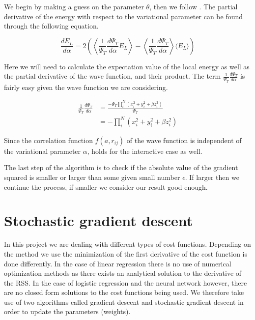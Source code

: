 We begin by making a guess on the parameter $\theta$, then we follow . The partial derivative of the energy with respect to the variational parameter can be found through the following equation.

\begin{equation}
\frac{dE_L}{d\alpha} = 2 \left( \left\langle \frac{1}{\Psi_T}\frac{d \Psi_T}{d \alpha} E_L \right\rangle  - \left\langle  \frac{1}{\Psi_T}\frac{d \Psi_T}{d \alpha} \right\rangle \langle E_L \rangle \right)
\end{equation}

Here we will need to calculate the expectation value of the local energy as well as the partial derivative of the wave function, and their product. The term $\frac{1}{\Psi_T}\frac{d \Psi_T}{d \alpha}$ is fairly easy given the wave function we are considering. 

\begin{align} \label{}
\frac{1}{\Psi_T}\frac{d \Psi_T}{d \alpha} &= \frac{-\Psi_T \prod_i^N (x_i^2 + y_i^2 + \beta z^2_i)}{\Psi_T} \\
&= -\prod_i^N (x_i^2 + y_i^2 + \beta z^2_i) \label{eq:frac_deri_wf}
\end{align}

Since the correlation function $f(a, r_{ij})$ of the wave function is independent of the variational parameter $\alpha$,  holds for the interactive case as well.

The last step of the algorithm is to check if the absolute value of the gradient squared is smaller or larger than some given small number $\epsilon$. If larger then we continue the process, if smaller we consider our result good enough. 

\section{Stochastic gradient descent}

In this project we are dealing with different types of cost functions. Depending on the method we use the minimization of the first derivative of the cost function is done differently. In the case of linear regression there is no use of numerical optimization methods as there exists an analytical solution to the derivative of the RSS. In the case of logistic regression and the neural network however, there are no closed form solutions to the cost functions being used. We therefore take use of two algorithms called gradient descent and stochastic gradient descent in order to update the parameters (weights).

